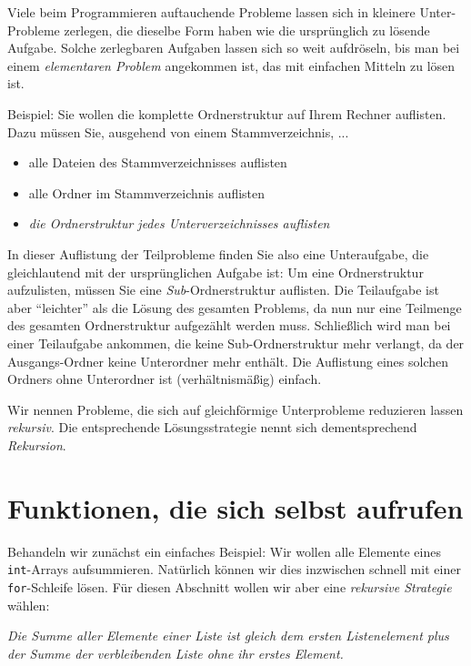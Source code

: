 Viele beim Programmieren auftauchende Probleme lassen sich in kleinere Unter-Probleme zerlegen, die dieselbe Form haben wie die ursprünglich zu lösende Aufgabe. Solche zerlegbaren Aufgaben lassen sich so weit aufdröseln, bis man bei einem \emph{elementaren Problem} angekommen ist, das mit einfachen Mitteln zu lösen ist.

Beispiel: Sie wollen die komplette Ordnerstruktur auf Ihrem Rechner auflisten. Dazu müssen Sie, ausgehend von einem Stammverzeichnis, ...
\begin{itemize}
\item alle Dateien des Stammverzeichnisses auflisten
\item alle Ordner im Stammverzeichnis auflisten
\item \emph{die Ordnerstruktur jedes Unterverzeichnisses auflisten}
\end{itemize}

In dieser Auflistung der Teilprobleme finden Sie also eine Unteraufgabe, die gleichlautend mit der ursprünglichen Aufgabe ist: Um eine Ordnerstruktur aufzulisten, müssen Sie eine \emph{Sub}-Ordnerstruktur auflisten. Die Teilaufgabe ist aber \enquote{leichter} als die Lösung des gesamten Problems, da nun nur eine Teilmenge des gesamten Ordnerstruktur aufgezählt werden muss. Schließlich wird man bei einer Teilaufgabe ankommen, die keine Sub-Ordnerstruktur mehr verlangt, da der Ausgangs-Ordner keine Unterordner mehr enthält. Die Auflistung eines solchen Ordners ohne Unterordner ist (verhältnismäßig) einfach.

Wir nennen Probleme, die sich auf gleichförmige Unterprobleme reduzieren lassen \emph{rekursiv}. Die entsprechende Lösungsstrategie nennt sich dementsprechend \emph{Rekursion}.

\section{Funktionen, die sich selbst aufrufen}
Behandeln wir zunächst ein einfaches Beispiel: Wir wollen alle Elemente eines \texttt{int}-Arrays aufsummieren. Natürlich können wir dies inzwischen schnell mit einer \texttt{for}-Schleife lösen. Für diesen Abschnitt wollen wir aber eine \emph{rekursive Strategie} wählen:

\begin{center}
\begin{minipage}{.8\linewidth}
\emph{Die Summe aller Elemente einer Liste ist gleich dem ersten Listenelement plus der Summe der verbleibenden Liste ohne ihr erstes Element.}
\end{minipage}
\end{center}

